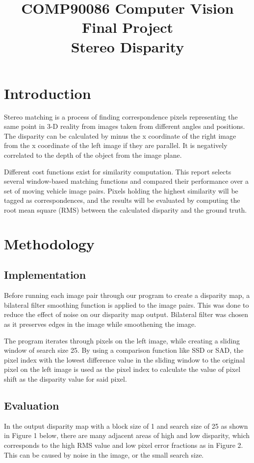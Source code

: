 \documentclass[conference]{IEEEtran}
\begin{document}
\title{COMP90086 Computer Vision Final Project\\
Stereo Disparity
}
\author{
\and
{}
}
\maketitle
\section{Introduction}
Stereo matching is a process of finding correspondence pixels representing the same point in 3-D reality from images taken from different angles and positions. The disparity can be calculated by minus the x coordinate of the right image from the x coordinate of the left image if they are parallel. It is negatively correlated to the depth of the object from the image plane.

Different cost functions exist for similarity computation. This report selects several window-based matching functions and compared their performance over a set of moving vehicle image pairs. Pixels holding the highest similarity will be tagged as correspondences, and the results will be evaluated by computing the root mean square (RMS) between the calculated disparity and the ground truth.
\section{Methodology}
\subsection{Implementation}
Before running each image pair through our program to create a disparity map, a bilateral filter smoothing function is applied to the image pairs. This was done to reduce the effect of noise on our disparity map output. Bilateral filter was chosen as it preserves edges in the image while smoothening the image.

The program iterates through pixels on the left image, while creating a sliding window of search size 25. By using a comparison function like SSD or SAD, the pixel index with the lowest difference value in the sliding window to the original pixel on the left image is used as the pixel index to calculate the value of pixel shift as the disparity value for said pixel.
\subsection{Evaluation}
In the output disparity map with a block size of 1 and search size of 25 as shown in Figure 1 below, there are many adjacent areas of high and low disparity, which corresponds to the high RMS value and low pixel error fractions as in Figure 2. This can be caused by noise in the image, or the small search size.
\end{document}
